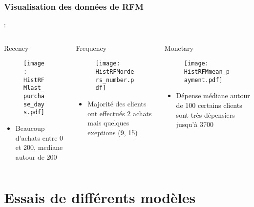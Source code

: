 \documentclass[8pt,aspectratio=169,hyperref={unicode=true}]{beamer}
\begin{document}
\subsubsection{Visualisation des données de RFM}
\begin{frame}{\insertsection: \insertsubsection}{\insertsubsubsection}
    \begin{columns}[t]
        \begin{column}{.33\textwidth}
            Recency
            \begin{figure}
                \texttt{[image: HistRFMlast\_purchase\_days.pdf]}
            \end{figure}
            \begin{itemize}
                \item Beaucoup d'achats entre 0 et 200, mediane autour de 200
            \end{itemize}
        \end{column}
        \begin{column}{.33\textwidth}
            Frequency
            \begin{figure}
                \texttt{[image: HistRFMorders\_number.pdf]}
            \end{figure}
            \begin{itemize}
                \item Majorité des clients ont effectués 2 achats mais quelques exeptions (9, 15)
            \end{itemize}
        \end{column}
        \begin{column}{.33\textwidth}
            Monetary
            \begin{figure}
                \texttt{[image: HistRFMmean\_payment.pdf]}
            \end{figure}
            \begin{itemize}
                \item Dépense médiane autour de 100  certains clients sont très dépensiers jusqu'à 3700
            \end{itemize}
        \end{column}
    \end{columns}
\end{frame}

\section{Essais de différents modèles}
\end{document}
